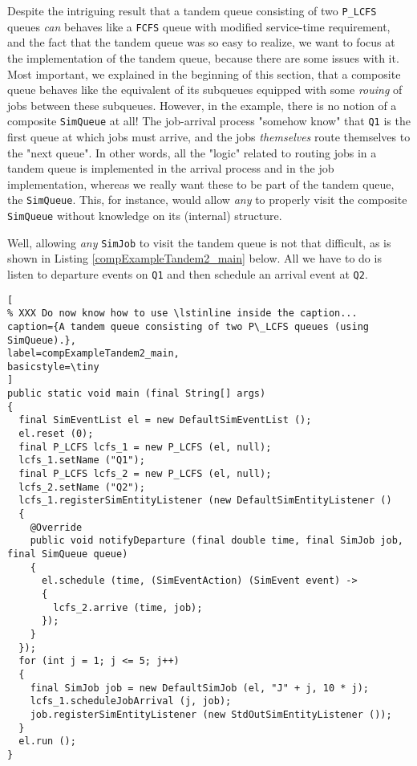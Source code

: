 \documentclass[12pt]{book}
\begin{document}
Despite the intriguing result that a tandem queue consisting of two
  \lstinline|P_LCFS| queues {\em can\/} behaves like a \lstinline|FCFS|
  queue with modified service-time requirement,
  and the fact that the tandem queue was so easy to realize,
  we want to focus at the implementation of the tandem queue,
  because there are some issues with it.
Most important,
  we explained in the beginning of this section,
  that a composite queue behaves like the equivalent
  of its subqueues equipped with some
  {\em rouing\/} of jobs between these subqueues.
However, in the example, there is no notion of a composite
  \lstinline|SimQueue| at all!
The job-arrival process "somehow know" that \lstinline|Q1|
  is the first queue at which jobs must arrive,
  and the jobs {\em themselves\/} route themselves
  to the "next queue".
In other words, all the "logic" related to routing jobs in a
  tandem queue is implemented in the arrival process and
  in the job implementation,
  whereas we really want these to be part of the tandem queue,
  the \lstinline|SimQueue|.
This, for instance, would allow {\em any\/} to properly visit the
  composite \lstinline{SimQueue} without knowledge on its
  (internal) structure.

Well, allowing {\em any\/} \lstinline|SimJob| to visit
  the tandem queue is not that difficult,
  as is shown in Listing \ref{compExampleTandem2_main} below.
All we have to do is listen to departure events
  on \lstinline|Q1| and then schedule an arrival event at \lstinline|Q2|.

\begin{lstlisting}[
% XXX Do now know how to use \lstinline inside the caption...
caption={A tandem queue consisting of two P\_LCFS queues (using SimQueue).},
label=compExampleTandem2_main,
basicstyle=\tiny
]
public static void main (final String[] args)
{    
  final SimEventList el = new DefaultSimEventList ();
  el.reset (0);
  final P_LCFS lcfs_1 = new P_LCFS (el, null);
  lcfs_1.setName ("Q1");
  final P_LCFS lcfs_2 = new P_LCFS (el, null);
  lcfs_2.setName ("Q2");
  lcfs_1.registerSimEntityListener (new DefaultSimEntityListener ()
  {
    @Override
    public void notifyDeparture (final double time, final SimJob job, final SimQueue queue)
    {
      el.schedule (time, (SimEventAction) (SimEvent event) ->
      {
        lcfs_2.arrive (time, job);
      });
    }
  });
  for (int j = 1; j <= 5; j++)
  {
    final SimJob job = new DefaultSimJob (el, "J" + j, 10 * j);
    lcfs_1.scheduleJobArrival (j, job);
    job.registerSimEntityListener (new StdOutSimEntityListener ());
  }
  el.run ();
}
\end{lstlisting}
\end{document}
